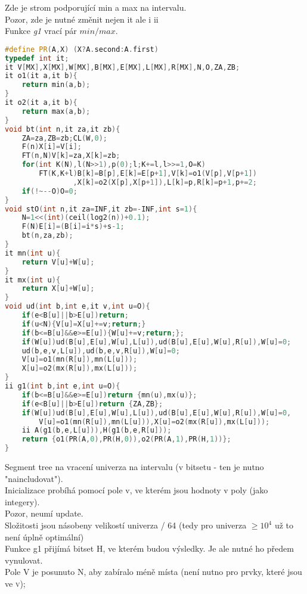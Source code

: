 \documentclass[11pt]{article}
\begin{document}
Zde je strom podporující min a max na intervalu.
\\Pozor, zde je nutné změnit nejen \textsf{it} ale i \textsf{ii}
\\Funkce \textit{g1} vrací pár $min/max$.
\begin{lstlisting}[language=C++]
#define PR(A,X) (X?A.second:A.first)
typedef int it;
it V[MX],X[MX],W[MX],B[MX],E[MX],L[MX],R[MX],N,O,ZA,ZB;
it o1(it a,it b){
    return min(a,b);
}
it o2(it a,it b){
    return max(a,b);
}
void bt(int n,it za,it zb){
    ZA=za,ZB=zb;CL(W,0);
    F(n)X[i]=V[i];
    FT(n,N)V[k]=za,X[k]=zb;
    for(int K(N),l(N>>1),p(0);l;K+=l,l>>=1,O=K)
        FT(K,K+l)B[k]=B[p],E[k]=E[p+1],V[k]=o1(V[p],V[p+1])
                ,X[k]=o2(X[p],X[p+1]),L[k]=p,R[k]=p+1,p+=2;
    if(!~--O)O=0;
}
void stO(int n,it za=INF,it zb=-INF,int s=1){
    N=1<<(int)(ceil(log2(n))+0.1);
    F(N)E[i]=(B[i]=i*s)+s-1;
    bt(n,za,zb);
}
it mn(int u){
    return V[u]+W[u];
}
it mx(int u){
    return X[u]+W[u];
}
void ud(int b,int e,it v,int u=O){
    if(e<B[u]||b>E[u])return;
    if(u<N){V[u]=X[u]+=v;return;}
    if(b<=B[u]&&e>=E[u]){W[u]+=v;return;};
    if(W[u])ud(B[u],E[u],W[u],L[u]),ud(B[u],E[u],W[u],R[u]),W[u]=0;
    ud(b,e,v,L[u]),ud(b,e,v,R[u]),W[u]=0;
    V[u]=o1(mn(R[u]),mn(L[u]));
    X[u]=o2(mx(R[u]),mx(L[u]));
}
ii g1(int b,int e,int u=O){
    if(b<=B[u]&&e>=E[u])return {mn(u),mx(u)};
    if(e<B[u]||b>E[u])return {ZA,ZB};
    if(W[u])ud(B[u],E[u],W[u],L[u]),ud(B[u],E[u],W[u],R[u]),W[u]=0,
        V[u]=o1(mn(R[u]),mn(L[u])),X[u]=o2(mx(R[u]),mx(L[u]));
    ii A(g1(b,e,L[u])),H(g1(b,e,R[u]));
    return {o1(PR(A,0),PR(H,0)),o2(PR(A,1),PR(H,1))};
}
\end{lstlisting}
Segment tree na vracení univerza na intervalu (v bitsetu - ten je nutno "naincludovat").
\\Inicializace probíhá pomocí pole \textsf{v}, ve kterém jsou hodnoty v poly (jako integery).
\\Pozor, neumí update.
\\Složitosti jsou násobeny velikostí univerza / 64 (tedy pro univerza $\geq 10^4$ už to není úplně optimální)
\\Funkce \textsf{g1} přijímá bitset \textsf{H}, ve kterém budou výsledky. Je ale nutné ho předem vynulovat.
\\Pole \textsf{V} je posunuto \textsf{N}, aby zabíralo méně místa (není nutno pro prvky, které jsou ve \textsc{v});
\end{document}
